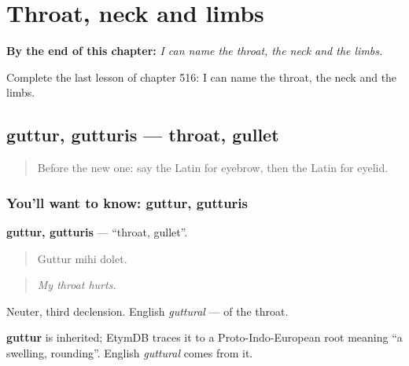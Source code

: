 
\chapter{Throat, neck and limbs}
\label{ch:la-throat-neck-and-limbs}

\begin{chapteropening}
\textbf{By the end of this chapter:} \emph{I can name the throat, the neck and the limbs.}

Complete the last lesson of chapter 516: I can name the throat, the neck and the limbs.
\end{chapteropening}

\section[guttur, gutturis]{guttur, gutturis — throat, gullet}

\label{lesson:LA-C516-guttur}



\begin{quote}
Before the new one: say the Latin for eyebrow, then the Latin for eyelid.
\end{quote}

\subsection*{You'll want to know: guttur, gutturis}
\textbf{guttur, gutturis} — \textquotedblleft{}throat, gullet\textquotedblright{}.

\begin{quote}
Guttur mihi dolet.
\end{quote}

\begin{quote}
\emph{My throat hurts.}
\end{quote}

Neuter, third declension. English \emph{guttural} — of the throat.

\begin{cousinweb}
\textbf{guttur} is inherited; EtymDB traces it to a Proto-Indo-European root meaning \textquotedblleft{}a swelling, rounding\textquotedblright{}. English \emph{guttural} comes from it.
\end{cousinweb}

